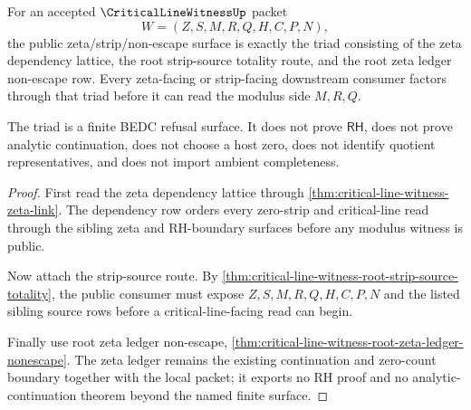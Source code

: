 \begin{theorem}
\label{thm:critical-line-witness-root-zeta-strip-nonescape-triad}
For an accepted $\CriticalLineWitnessUp$ packet
$$
W=(Z,S,M,R,Q,H,C,P,N),
$$
the public zeta/strip/non-escape surface is exactly the triad consisting of
the zeta dependency lattice, the root strip-source totality route, and the
root zeta ledger non-escape row. Every zeta-facing or strip-facing downstream
consumer factors through that triad before it can read the modulus side
$M,R,Q$.

The triad is a finite BEDC refusal surface. It does not prove
$\mathsf{RH}$, does not prove analytic continuation, does not choose a host
zero, does not identify quotient representatives, and does not import ambient
completeness.
\end{theorem}
\begin{proof}
First read the zeta dependency lattice through
\autoref{thm:critical-line-witness-zeta-link}. The dependency row orders every
zero-strip and critical-line read through the sibling zeta and RH-boundary
surfaces before any modulus witness is public.

Now attach the strip-source route. By
\autoref{thm:critical-line-witness-root-strip-source-totality}, the public
consumer must expose $Z,S,M,R,Q,H,C,P,N$ and the listed sibling source rows
before a critical-line-facing read can begin.

Finally use root zeta ledger non-escape,
\autoref{thm:critical-line-witness-root-zeta-ledger-nonescape}. The zeta
ledger remains the existing continuation and zero-count boundary together
with the local packet; it exports no RH proof and no analytic-continuation
theorem beyond the named finite surface.
\end{proof}

